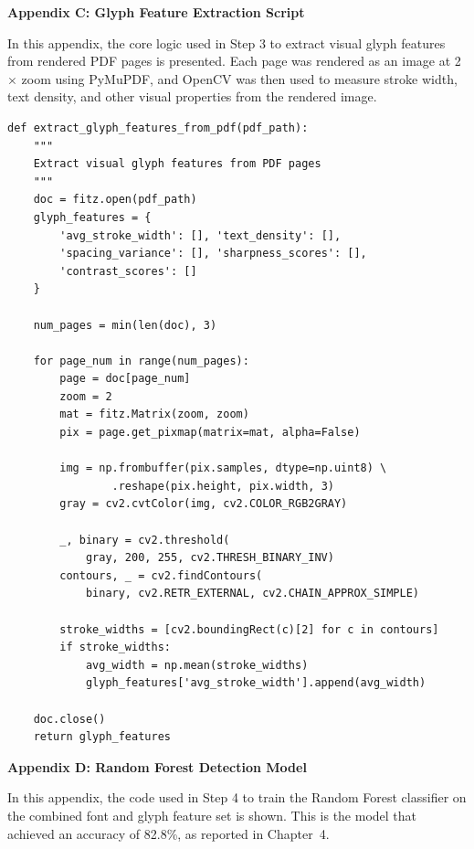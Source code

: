 \noindent
\textbf{Appendix C: Glyph Feature Extraction Script}

\noindent
In this appendix, the core logic used in Step 3 to extract visual glyph features from rendered PDF pages is presented. Each page was rendered as an image at 2$\times$ zoom using PyMuPDF, and OpenCV was then used to measure stroke width, text density, and other visual properties from the rendered image.

\small
\begin{verbatim}
def extract_glyph_features_from_pdf(pdf_path):
    """
    Extract visual glyph features from PDF pages
    """
    doc = fitz.open(pdf_path)
    glyph_features = {
        'avg_stroke_width': [], 'text_density': [],
        'spacing_variance': [], 'sharpness_scores': [],
        'contrast_scores': []
    }

    num_pages = min(len(doc), 3)

    for page_num in range(num_pages):
        page = doc[page_num]
        zoom = 2
        mat = fitz.Matrix(zoom, zoom)
        pix = page.get_pixmap(matrix=mat, alpha=False)

        img = np.frombuffer(pix.samples, dtype=np.uint8) \
                .reshape(pix.height, pix.width, 3)
        gray = cv2.cvtColor(img, cv2.COLOR_RGB2GRAY)

        _, binary = cv2.threshold(
            gray, 200, 255, cv2.THRESH_BINARY_INV)
        contours, _ = cv2.findContours(
            binary, cv2.RETR_EXTERNAL, cv2.CHAIN_APPROX_SIMPLE)

        stroke_widths = [cv2.boundingRect(c)[2] for c in contours]
        if stroke_widths:
            avg_width = np.mean(stroke_widths)
            glyph_features['avg_stroke_width'].append(avg_width)

    doc.close()
    return glyph_features
\end{verbatim}

\vspace{.2in}

\noindent
\textbf{Appendix D: Random Forest Detection Model}

\noindent
In this appendix, the code used in Step 4 to train the Random Forest classifier on the combined font and glyph feature set is shown. This is the model that achieved an accuracy of 82.8\%, as reported in Chapter~4.

